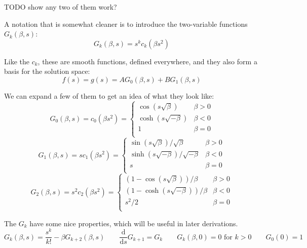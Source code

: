 \documentclass{article}
\newcommand{\dd}{\mathrm{d}}
\newcommand{\der}[2]{\frac{\dd #1}{\dd #2}}
\numberwithin{equation}{subsection}
\begin{document}
TODO show any two of them work?

A notation that is somewhat cleaner is to introduce the two-variable functions $G_k(\beta, s)$:
\begin{equation}
G_k(\beta, s) = s^k c_k(\beta s^2)
\end{equation}

Like the $c_k$, these are smooth functions, defined everywhere, and they also form a basis for the solution space:
\begin{equation}
f(s) = g(s) = A G_0(\beta, s) + B G_1(\beta, s)
\end{equation}

We can expand a few of them to get an idea of what they look like:
\begin{equation}
\label{expanded-g0}
G_0(\beta, s) = c_0(\beta s^2) = \begin{cases}
\cos(s \sqrt \beta)    & \beta > 0 \\
\cosh(s \sqrt{-\beta}) & \beta < 0 \\
1                      & \beta = 0 \\
\end{cases}
\end{equation}
\begin{equation}
\label{expanded-g1}
G_1(\beta, s) = s c_1(\beta s^2) = \begin{cases}
\sin(s \sqrt{\beta}) / \sqrt{\beta}    & \beta > 0 \\
\sinh(s \sqrt{-\beta}) / \sqrt{-\beta} & \beta < 0 \\
s                                      & \beta = 0 \\
\end{cases}
\end{equation}
\begin{equation}
\label{expanded-g2}
G_2(\beta, s) = s^2 c_2(\beta s^2) = \begin{cases}
(1 - \cos(s \sqrt \beta)) / \beta    & \beta > 0 \\
(1 - \cosh(s \sqrt{-\beta})) / \beta & \beta < 0 \\
s^2/2                                & \beta = 0 \\
\end{cases}
\end{equation}

The $G_k$ have some nice properties, which will be useful in later derivations.
\begin{equation*}
G_k(\beta, s) = \frac{s^k}{k!} - \beta G_{k+2}(\beta, s) \qquad
\der{}{s} G_{k+1} = G_k \qquad G_k(\beta, 0) = 0 \textrm{ for } k > 0 \qquad G_0(0) = 1
\end{equation*}
\end{document}
